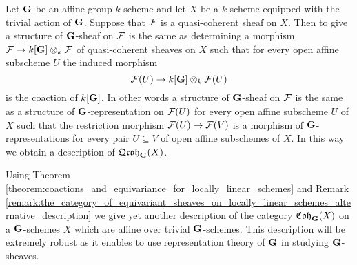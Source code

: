 \begin{example}\label{example:equivariant_sheaves_on_trivial_equivariant_schemes}
Let $\mathbf{G}$ be an affine group $k$-scheme and let $X$ be a $k$-scheme equipped with the trivial action of $\mathbf{G}$. Suppose that ${\mathcal F}$ is a quasi-coherent sheaf on $X$. Then to give a structure of $\mathbf{G}$-sheaf on ${\mathcal F}$ is the same as determining a morphism ${\mathcal F} \rightarrow k[\mathbf{G}]\otimes_k{\mathcal F}$ of quasi-coherent sheaves on $X$ such that for every open affine subscheme $U$ the induced morphism
$${\mathcal F}(U) \rightarrow k[\mathbf{G}]\otimes_k{\mathcal F}(U)$$
is the coaction of $k[\mathbf{G}]$. In other words a structure of $\mathbf{G}$-sheaf on ${\mathcal F}$ is the same as a structure of $\mathbf{G}$-representation on ${\mathcal F}(U)$ for every open affine subscheme $U$ of $X$ such that the restriction morphism ${\mathcal F}(U)\rightarrow {\mathcal F}(V)$ is a morphism of $\mathbf{G}$-representations for every pair $U\subseteq V$ of open affine subschemes of $X$. In this way we obtain a description of $\mathfrak{Qcoh}_{\mathbf{G}}(X)$.
\end{example}
\noindent
Using Theorem \ref{theorem:coactions_and_equivariance_for_locally_linear_schemes} and Remark \ref{remark:the_category_of_equivariant_sheaves_on_locally_linear_schemes_alternative_description} we give yet another description of the category $\mathfrak{Coh}_{\mathbf{G}}(X)$ on a $\mathbf{G}$-schemes $X$ which are affine over trivial $\mathbf{G}$-schemes. This description will be extremely robust as it enables to use representation theory of $\mathbf{G}$ in studying $\mathbf{G}$-sheaves. 

